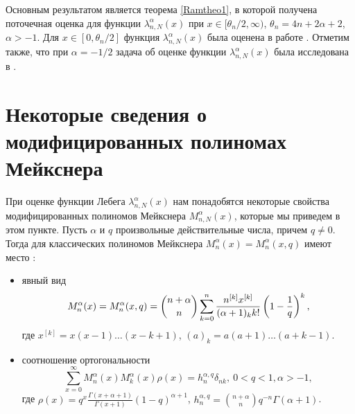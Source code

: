 Основным результатом является теорема \ref{Ramtheo1}, в которой получена поточечная оценка для функции $\lambda_{n,N}^{\alpha}(x)$ при $x\in[\theta_n/2,\infty)$, $\theta_n=4n+2\alpha+2$, $\alpha>-1$.
Для $x\in[0,\theta_n/2]$ функция $\lambda_{n,N}^{\alpha}(x)$ была оценена в работе \cite{Rampetrazav}. Отметим также, что при $\alpha=-1/2$ задача об оценке функции $\lambda_{n,N}^{\alpha}(x)$ была исследована в \cite{Ram3}.

\section{Некоторые сведения о модифицированных полиномах Мейкснера}

При оценке функции Лебега $\lambda_{n,N}^{\alpha}(x)$ нам понадобятся некоторые свойства модифицированных полиномов Мейкснера $M_{n,N}^{\alpha}(x)$, которые мы приведем в этом пункте.
Пусть $\alpha$ и $q$ произвольные действительные числа, причем $q\neq0$. Тогда для классических полиномов Мейкснера $M_n^\alpha(x)=M_n^\alpha(x,q)$ имеют место
\cite{RamNik,RamBateman,RamSharMnog}:
\begin{itemize}
  \item
явный вид
\begin{equation*}
M_n^\alpha(x)=M_n^\alpha(x,q)={n+\alpha\choose n}\sum_{k=0}^n{n^{[k]}x^{[k]}\over(\alpha+1)_kk!}\left(1-{1\over q}\right)^k,
\end{equation*}
где $x^{[k]}=x(x-1)\ldots (x-k+1)$, $(a)_k=a(a+1)\ldots(a+k-1)$.
\item
соотношение ортогональности
$$
\sum_{x=0}^{\infty} M_{n}^\alpha(x)M_{k}^\alpha(x)\rho(x)=h_{n}^{\alpha,q}\delta_{nk},\ 0<q<1, \alpha>-1,
$$
где $\rho(x)=q^x\frac{\Gamma(x+\alpha+1)}{\Gamma(x+1)}(1-q)^{\alpha+1}$,
$h_{n}^{\alpha,q}={n+\alpha\choose n}q^{-n}\Gamma(\alpha+1)$.
\end{itemize}

